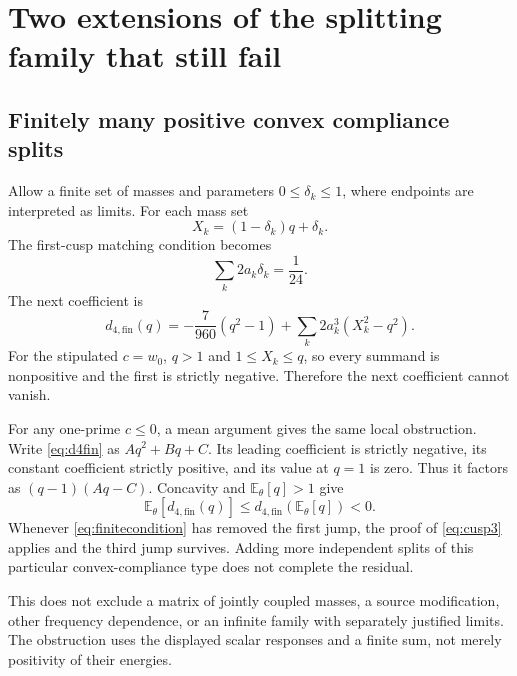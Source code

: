 \documentclass[11pt]{article}
\numberwithin{equation}{section}
\theoremstyle{definition}
\theoremstyle{remark}
\newcommand{\avg}[1]{\mathbb E_{\theta}\!\left[#1\right]}
\begin{document}
\section{Two extensions of the splitting family that still fail}
\label{sec:extensions}
\subsection{Finitely many positive convex compliance splits}
Allow a finite set of masses and parameters $0\le\delta_k\le1$, where endpoints are interpreted as limits. For each mass set
\begin{equation}
 X_k=(1-\delta_k)q+\delta_k.
\end{equation}
The first-cusp matching condition becomes
\begin{equation}
 \sum_k2a_k\delta_k=\frac1{24}.
 \label{eq:finitecondition}
\end{equation}
The next coefficient is
\begin{equation}
 d_{4,\mathrm{fin}}(q)=
 -\frac7{960}(q^2-1)+\sum_k2a_k^3(X_k^2-q^2).
 \label{eq:d4fin}
\end{equation}
For the stipulated $c=w_0$, $q>1$ and $1\le X_k\le q$, so every summand is nonpositive and the first is strictly negative. Therefore the next coefficient cannot vanish.

For any one-prime $c\le0$, a mean argument gives the same local obstruction. Write \eqref{eq:d4fin} as $Aq^2+Bq+C$. Its leading coefficient is strictly negative, its constant coefficient strictly positive, and its value at $q=1$ is zero. Thus it factors as $(q-1)(Aq-C)$. Concavity and $\avg q>1$ give
\begin{equation}
 \avg{d_{4,\mathrm{fin}}(q)}
 \le d_{4,\mathrm{fin}}(\avg q)<0.
\end{equation}
Whenever \eqref{eq:finitecondition} has removed the first jump, the proof of \eqref{eq:cusp3} applies and the third jump survives. Adding more independent splits of this particular convex-compliance type does not complete the residual.

This does not exclude a matrix of jointly coupled masses, a source modification, other frequency dependence, or an infinite family with separately justified limits. The obstruction uses the displayed scalar responses and a finite sum, not merely positivity of their energies.
\end{document}
